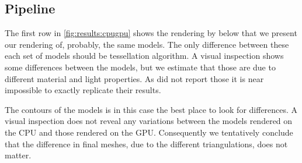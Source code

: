 
\subsection{Pipeline}
\label{s:results:pipeline}
	The first row in \cref{fig:results:cpugpu} shows the rendering by \citeauthor{vlachos2001curved} below that we present our rendering of, probably, the same models. The only difference between these each set of models should be tessellation algorithm. A visual inspection shows some differences between the models, but we estimate that those are due to different material and light properties. As \citeauthor{vlachos2001curved} did not report those it is near impossible to exactly replicate their results. 

	The contours of the models is in this case the best place to look for differences. A visual inspection does not reveal any variations between the models rendered on the CPU and those rendered on the GPU. Consequently we tentatively conclude that the difference in final meshes, due to the different triangulations, does not matter.

	
